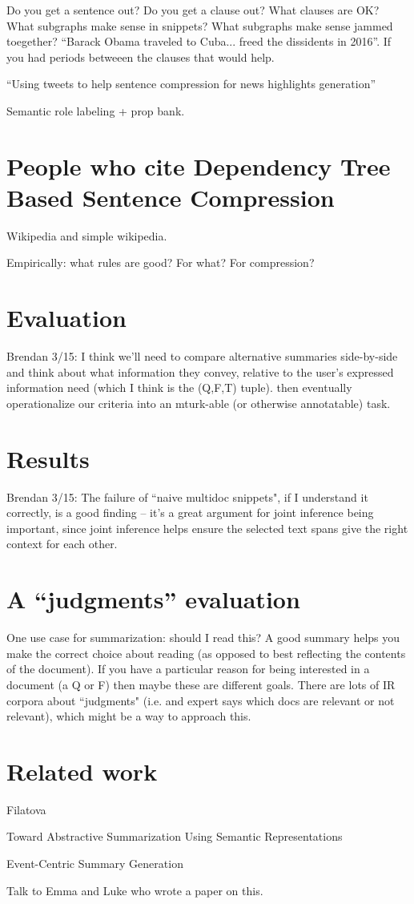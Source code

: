 \documentclass[11pt]{article}
\begin{document}
Do you get a sentence out? Do you get a clause out? What clauses are OK? What subgraphs make sense in snippets? What subgraphs make sense jammed toegether? ``Barack Obama traveled to Cuba... freed the dissidents in 2016''. If you had periods betweeen the clauses that would help.

``Using tweets to help sentence compression for news highlights generation''

Semantic role labeling + prop bank.

\section{People who cite Dependency Tree Based Sentence Compression}

Wikipedia and simple wikipedia. 

Empirically: what rules are good? For what? For compression?


\section{Evaluation}

Brendan 3/15: I think we'll need to compare alternative summaries side-by-side and think about what information they convey, relative to the user's expressed information need (which I think is the (Q,F,T) tuple).  then eventually operationalize our criteria into an mturk-able (or otherwise annotatable) task.

\section{Results}

Brendan 3/15: The failure of ``naive multidoc snippets", if I understand it correctly, is a good finding -- it's a great argument for joint inference being important, since joint inference helps ensure the selected text spans give the right context for each other.

\section{A ``judgments'' evaluation}
One use case for summarization: should I read this? A good summary helps you make the correct choice about reading (as opposed to best reflecting the contents of the document). If you have a particular reason for being interested in a document (a Q or F) then maybe these are different goals. There are lots of IR corpora about ``judgments" (i.e. and expert says which docs are relevant or not relevant), which might be a way to approach this.

\section{Related work}

Filatova

Toward Abstractive Summarization Using Semantic Representations

Event-Centric Summary Generation 

Talk to Emma and Luke who wrote a paper on this.

\printbibliography
\end{document}

